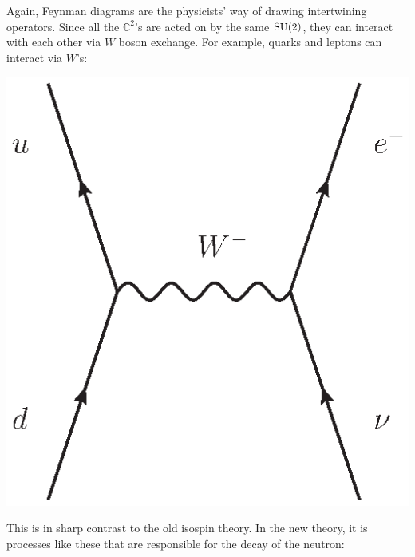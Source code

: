 \documentclass{article}
\newcommand{\C}{{\mathbb C}}  %
\newcommand{\SU}{{\rm SU}}    %
\begin{document}
Again, Feynman diagrams are the physicists' way of drawing
intertwining operators.  Since all the $\C^2$'s are acted on by the same
$\SU(2)$, they can interact with each other via $W$ boson exchange. For
example, quarks and leptons can interact via $W$'s:
\begin{center}
	\includegraphics[scale=0.75]{qlW_exchange}
\end{center}
This is in sharp contrast to the old isospin theory.
In the new theory, it is processes like these that are
responsible for the decay of the neutron:
\end{document}
